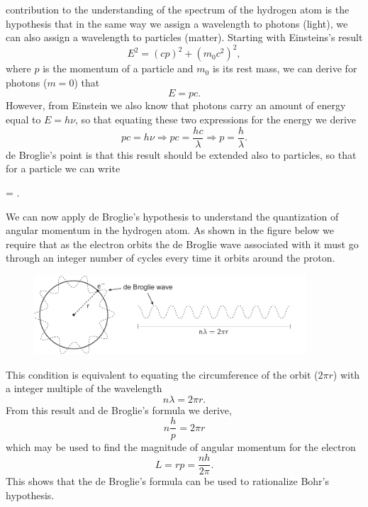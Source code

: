 \documentclass[../Main/chem331-notes.tex]{subfiles}
\begin{document}
 contribution to the understanding of the spectrum of the hydrogen atom is the hypothesis that in the same way we assign a wavelength to photons (light), we can also assign a wavelength to particles (matter).
Starting with Einsteins's result
\begin{equation}
E^2 = (cp)^2 + (m_0 c^2)^2,
\end{equation}
where $p$ is the momentum of a particle and $m_0$ is its rest mass, we can derive for photons ($m = 0$) that
\begin{equation}
E = pc.
\end{equation}
However, from Einstein we also know that photons carry an amount of energy equal to $E = h \nu$, so that equating these two expressions for the energy we derive
\begin{equation}
pc = h \nu \Rightarrow pc = \frac{hc}{\lambda}  \Rightarrow p = \frac{h}{\lambda}.
\end{equation}
de Broglie's point is that this result should be extended also to particles, so that for a particle we can write
\begin{iequation}
\lambda = .
\end{iequation}

We can now apply de Broglie's hypothesis to understand the quantization of angular momentum in the hydrogen atom.
As shown in the figure below we require that as the electron orbits the de Broglie wave associated with it must go through an integer number of cycles every time it orbits around the proton. 
\begin{figure}[htbp]
   \centering
   \includegraphics[width=4in]{../Figures/deBroglieWave.pdf} %
\end{figure}

This condition is equivalent to equating the circumference of the orbit ($ 2 \pi r$) with a integer multiple of the wavelength
\begin{equation}
n \lambda = 2 \pi r.
\end{equation}
From this result and de Broglie's formula we derive,
\begin{equation}
n \frac{h}{p} = 2 \pi r
\end{equation}
which may be used to find the magnitude of angular momentum for the electron
\begin{equation}
\label{eq:bohr:angular_momentum}
L = r p = \frac{n h}{2 \pi}.
\end{equation}
 This shows that the de Broglie's formula can be used to rationalize Bohr's hypothesis.
 
\end{document}
